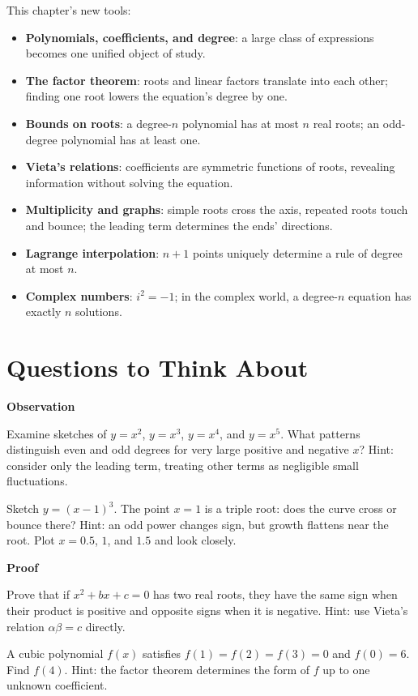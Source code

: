 \begin{toolbox}
This chapter's new tools:
\begin{itemize}
\item \textbf{Polynomials, coefficients, and degree}: a large class of expressions becomes one unified object of study.
\item \textbf{The factor theorem}: roots and linear factors translate into each other; finding one root lowers the equation's degree by one.
\item \textbf{Bounds on roots}: a degree-$n$ polynomial has at most $n$ real roots; an odd-degree polynomial has at least one.
\item \textbf{Vieta's relations}: coefficients are symmetric functions of roots, revealing information without solving the equation.
\item \textbf{Multiplicity and graphs}: simple roots cross the axis, repeated roots touch and bounce; the leading term determines the ends' directions.
\item \textbf{Lagrange interpolation}: $n+1$ points uniquely determine a rule of degree at most $n$.
\item \textbf{Complex numbers}: $i^2=-1$; in the complex world, a degree-$n$ equation has exactly $n$ solutions.
\end{itemize}
\end{toolbox}

\section*{Questions to Think About}

\textbf{Observation}
\begin{sikao}
\item Examine sketches of $y=x^2$, $y=x^3$, $y=x^4$, and $y=x^5$. What patterns distinguish even and odd degrees for very large positive and negative $x$? Hint: consider only the leading term, treating other terms as negligible small fluctuations.
\item Sketch $y=(x-1)^3$. The point $x=1$ is a triple root: does the curve cross or bounce there? Hint: an odd power changes sign, but growth flattens near the root. Plot $x=0.5$, $1$, and $1.5$ and look closely.
\end{sikao}

\textbf{Proof}
\begin{sikao}
\item Prove that if $x^2+bx+c=0$ has two real roots, they have the same sign when their product is positive and opposite signs when it is negative. Hint: use Vieta's relation $\alpha\beta=c$ directly.
\item A cubic polynomial $f(x)$ satisfies $f(1)=f(2)=f(3)=0$ and $f(0)=6$. Find $f(4)$. Hint: the factor theorem determines the form of $f$ up to one unknown coefficient.
\end{sikao}

